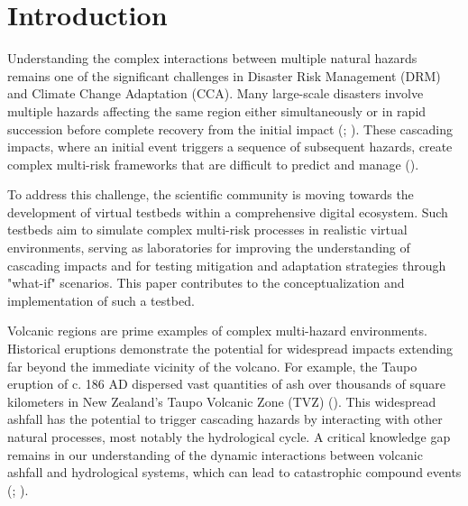 \documentclass[12pt, a4paper]{article}
\begin{document}
\section{Introduction}
Understanding the complex interactions between multiple natural hazards remains one of the significant challenges in Disaster Risk Management (DRM) and Climate Change Adaptation (CCA). Many large-scale disasters involve multiple hazards affecting the same region either simultaneously or in rapid succession before complete recovery from the initial impact (\citealp{Guha-Sapir2016}; \citealp{DesInventar2023}). These cascading impacts, where an initial event triggers a sequence of subsequent hazards, create complex multi-risk frameworks that are difficult to predict and manage (\citealp{Liu2016}).

To address this challenge, the scientific community is moving towards the development of virtual testbeds within a comprehensive digital ecosystem. Such testbeds aim to simulate complex multi-risk processes in realistic virtual environments, serving as laboratories for improving the understanding of cascading impacts and for testing mitigation and adaptation strategies through "what-if" scenarios. This paper contributes to the conceptualization and implementation of such a testbed.

Volcanic regions are prime examples of complex multi-hazard environments. Historical eruptions demonstrate the potential for widespread impacts extending far beyond the immediate vicinity of the volcano. For example, the Taupo eruption of c. 186 AD dispersed vast quantities of ash over thousands of square kilometers in New Zealand's Taupo Volcanic Zone (TVZ) (\citealp{Wilson1985}). This widespread ashfall has the potential to trigger cascading hazards by interacting with other natural processes, most notably the hydrological cycle. A critical knowledge gap remains in our understanding of the dynamic interactions between volcanic ashfall and hydrological systems, which can lead to catastrophic compound events (\citealp{Gran2006}; \citealp{Gran2011}).
\end{document}
